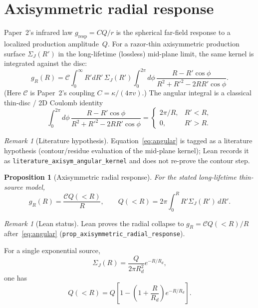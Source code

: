 \documentclass[11pt]{article}
\newtheorem{proposition}[theorem]{Proposition}
\theoremstyle{definition}
\theoremstyle{remark}
\newtheorem{remark}[theorem]{Remark}
\begin{document}
\section{Axisymmetric radial response}
\label{sec:radial}
Paper~2's infrared law \(g_{\mathrm{resp}}=CQ/r\) is the spherical far-field response to a localized production amplitude~$Q$.
For a razor-thin axisymmetric production surface $\Sigma_J(R')$ in the long-lifetime (lossless) mid-plane limit, the same kernel is integrated against the disc:
\begin{equation}
\label{eq:kernel-integral}
g_R(R)=\mathcal C\int_0^\infty R'dR'\,\Sigma_J(R')\int_0^{2\pi}d\phi\,
\frac{R-R'\cos\phi}{R^2+R'^2-2RR'\cos\phi}.
\end{equation}
(Here $\mathcal C$ is Paper~2's coupling $C=\kappa/(4\pi v)$.)
The angular integral is a classical thin-disc / 2D Coulomb identity
\begin{equation}
\label{eq:angular}
\int_0^{2\pi}d\phi\,
\frac{R-R'\cos\phi}{R^2+R'^2-2RR'\cos\phi}
=\begin{cases}2\pi/R,&R'<R,\\0,&R'>R.\end{cases}
\end{equation}
\begin{remark}[Literature hypothesis]
\label{rem:angular-literature}
Equation~\eqref{eq:angular} is tagged as a literature hypothesis (contour/residue evaluation of the mid-plane kernel); Lean records it as \texttt{literature\_axisym\_angular\_kernel} and does not re-prove the contour step.
\end{remark}
\begin{proposition}[Axisymmetric radial response]
\label{prop:axisym-radial}
For the stated long-lifetime thin-source model,
\begin{equation}
\boxed{g_R(R)=\frac{\mathcal C Q(<R)}{R}},\qquad
Q(<R)=2\pi\int_0^R R'\Sigma_J(R')\,dR'.
\end{equation}
\end{proposition}
\begin{remark}[Lean status]
Lean proves the radial collapse to $g_R=\mathcal C Q(<R)/R$ after~\eqref{eq:angular} (\texttt{prop\_axisymmetric\_radial\_response}).
\end{remark}
For a single exponential source,
\begin{equation}
\Sigma_J(R)=\frac{Q}{2\pi R_d^2}e^{-R/R_d},
\end{equation}
one has
\begin{equation}
Q(<R)=Q\left[1-\left(1+\frac{R}{R_d}\right)e^{-R/R_d}\right].
\end{equation}
\end{document}
